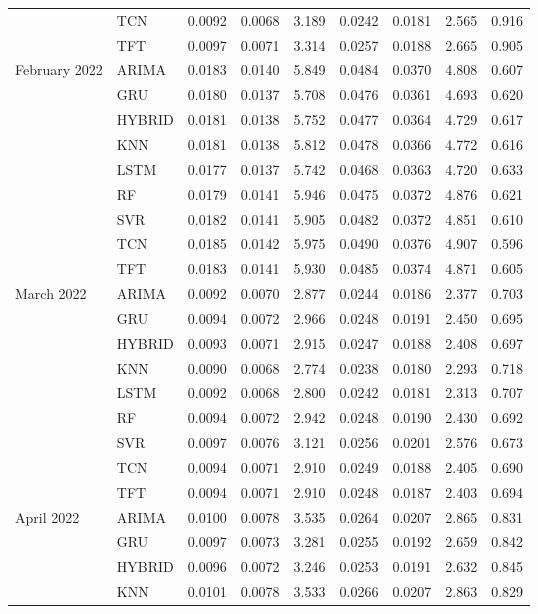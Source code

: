 \begin{tabular}{lllllllll}
 & TCN & 0.0092 & 0.0068 & 3.189 & 0.0242 & 0.0181 & 2.565 & 0.916 \\
 & TFT & 0.0097 & 0.0071 & 3.314 & 0.0257 & 0.0188 & 2.665 & 0.905 \\
February 2022 & ARIMA & 0.0183 & 0.0140 & 5.849 & 0.0484 & 0.0370 & 4.808 & 0.607 \\
 & GRU & 0.0180 & 0.0137 & 5.708 & 0.0476 & 0.0361 & 4.693 & 0.620 \\
 & HYBRID & 0.0181 & 0.0138 & 5.752 & 0.0477 & 0.0364 & 4.729 & 0.617 \\
 & KNN & 0.0181 & 0.0138 & 5.812 & 0.0478 & 0.0366 & 4.772 & 0.616 \\
 & LSTM & 0.0177 & 0.0137 & 5.742 & 0.0468 & 0.0363 & 4.720 & 0.633 \\
 & RF & 0.0179 & 0.0141 & 5.946 & 0.0475 & 0.0372 & 4.876 & 0.621 \\
 & SVR & 0.0182 & 0.0141 & 5.905 & 0.0482 & 0.0372 & 4.851 & 0.610 \\
 & TCN & 0.0185 & 0.0142 & 5.975 & 0.0490 & 0.0376 & 4.907 & 0.596 \\
 & TFT & 0.0183 & 0.0141 & 5.930 & 0.0485 & 0.0374 & 4.871 & 0.605 \\
March 2022 & ARIMA & 0.0092 & 0.0070 & 2.877 & 0.0244 & 0.0186 & 2.377 & 0.703 \\
 & GRU & 0.0094 & 0.0072 & 2.966 & 0.0248 & 0.0191 & 2.450 & 0.695 \\
 & HYBRID & 0.0093 & 0.0071 & 2.915 & 0.0247 & 0.0188 & 2.408 & 0.697 \\
 & KNN & 0.0090 & 0.0068 & 2.774 & 0.0238 & 0.0180 & 2.293 & 0.718 \\
 & LSTM & 0.0092 & 0.0068 & 2.800 & 0.0242 & 0.0181 & 2.313 & 0.707 \\
 & RF & 0.0094 & 0.0072 & 2.942 & 0.0248 & 0.0190 & 2.430 & 0.692 \\
 & SVR & 0.0097 & 0.0076 & 3.121 & 0.0256 & 0.0201 & 2.576 & 0.673 \\
 & TCN & 0.0094 & 0.0071 & 2.910 & 0.0249 & 0.0188 & 2.405 & 0.690 \\
 & TFT & 0.0094 & 0.0071 & 2.910 & 0.0248 & 0.0187 & 2.403 & 0.694 \\
April 2022 & ARIMA & 0.0100 & 0.0078 & 3.535 & 0.0264 & 0.0207 & 2.865 & 0.831 \\
 & GRU & 0.0097 & 0.0073 & 3.281 & 0.0255 & 0.0192 & 2.659 & 0.842 \\
 & HYBRID & 0.0096 & 0.0072 & 3.246 & 0.0253 & 0.0191 & 2.632 & 0.845 \\
 & KNN & 0.0101 & 0.0078 & 3.533 & 0.0266 & 0.0207 & 2.863 & 0.829 \\

\end{tabular}
